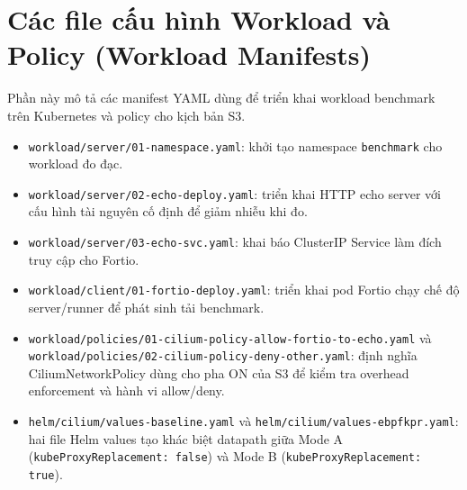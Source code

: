 \section{Các file cấu hình Workload và Policy (Workload Manifests)}

Phần này mô tả các manifest YAML dùng để triển khai workload benchmark trên Kubernetes và policy cho kịch bản S3.

\begin{itemize}
		\item \texttt{workload/server/01-namespace.yaml}: khởi tạo namespace \texttt{benchmark} cho workload đo đạc.
		\item \texttt{workload/server/02-echo-deploy.yaml}: triển khai HTTP echo server với cấu hình tài nguyên cố định để giảm nhiễu khi đo.
		\item \texttt{workload/server/03-echo-svc.yaml}: khai báo ClusterIP Service làm đích truy cập cho Fortio.
		\item \texttt{workload/client/01-fortio-deploy.yaml}: triển khai pod Fortio chạy chế độ server/runner để phát sinh tải benchmark.
		\item \texttt{workload/policies/01-cilium-policy-allow-fortio-to-echo.yaml} và \texttt{workload/policies/02-cilium-policy-deny-other.yaml}: định nghĩa CiliumNetworkPolicy dùng cho pha ON của S3 để kiểm tra overhead enforcement và hành vi allow/deny.
		\item \texttt{helm/cilium/values-baseline.yaml} và \texttt{helm/cilium/values-ebpfkpr.yaml}: hai file Helm values tạo khác biệt datapath giữa Mode A (\texttt{kubeProxyReplacement: false}) và Mode B (\texttt{kubeProxyReplacement: true}).
\end{itemize}


